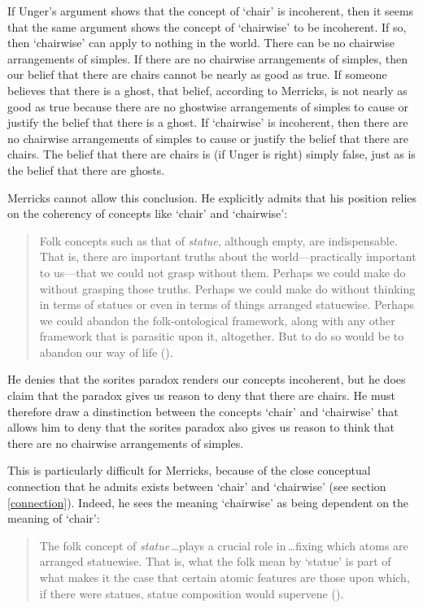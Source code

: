 \documentclass[11pt]{article}
\begin{document}
\begin{spacing}{1.5}
If Unger's argument shows that the concept of `chair' is incoherent,
then it seems that the same argument shows the concept of `chairwise'
to be incoherent.  If so, then `chairwise' can apply to nothing in the
world.  There can be no chairwise arrangements of simples.  If there
are no chairwise arrangements of simples, then our belief that there
are chairs cannot be nearly as good as true.  If someone believes that
there is a ghost, that belief, according to Merricks, is not nearly as
good as true because there are no ghostwise arrangements of simples to
cause or justify the belief that there is a ghost.  If `chairwise' is
incoherent, then there are no chairwise arrangements of simples to
cause or justify the belief that there are chairs.  The belief that
there are chairs is (if Unger is right) simply false, just as is the
belief that there are ghosts.

Merricks cannot allow this conclusion.  He explicitly admits that his
position relies on the coherency of concepts like `chair' and
`chairwise':

\begin{quote}
Folk concepts such as that of \emph{statue}, although empty, are
indispensable. That is, there are important truths about the
world---practically important to us---that we could not grasp without
them.  Perhaps we could make do without grasping those truths.
Perhaps we could make do without thinking in terms of statues or even
in terms of things arranged statuewise.  Perhaps we could abandon the
folk-ontological framework, along with any other framework that is
parasitic upon it, altogether.  But to do so would be to abandon our
way of life (\citeyear[190]{merricks2001a}).
\end{quote}

He denies that the sorites paradox renders our concepts incoherent,
but he does claim that the paradox gives us reason to deny that there
are chairs.  He must therefore draw a dinstinction between the
concepts `chair' and `chairwise' that allows him to deny that the
sorites paradox also gives us reason to think that there are no
chairwise arrangements of simples.

This is particularly difficult for Merricks, because of the close
conceptual connection that he admits exists between `chair' and
`chairwise' (see section \ref{connection}).  Indeed, he sees the
meaning `chairwise' as being dependent on the meaning of `chair':

\begin{quote}
The folk concept of \emph{statue}\,\ldots plays a crucial role
in\,\ldots fixing which atoms are arranged statuewise. That is, what
the folk mean by `statue' is part of what makes it the case that
certain atomic features are those upon which, if there were statues,
statue composition would supervene (\citeyear[6--7]{merricks2001a}).
\end{quote}


\end{spacing}
\end{document}
